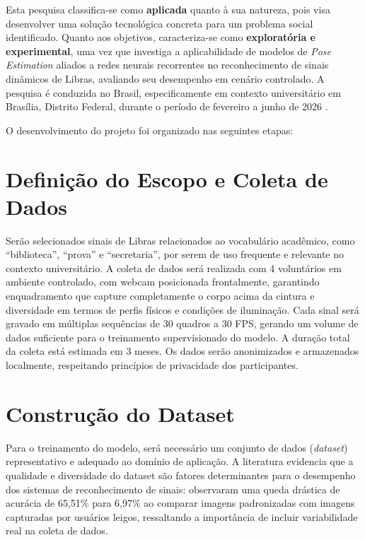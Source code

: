 
Esta pesquisa classifica-se como \textbf{aplicada} quanto à sua natureza, pois visa desenvolver uma solução tecnológica concreta para um problema social identificado. Quanto aos objetivos, caracteriza-se como \textbf{exploratória e experimental}, uma vez que investiga a aplicabilidade de modelos de \textit{Pose Estimation} aliados a redes neurais recorrentes no reconhecimento de sinais dinâmicos de Libras, avaliando seu desempenho em cenário controlado. A pesquisa é conduzida no Brasil, especificamente em contexto universitário em Brasília, Distrito Federal, durante o período de fevereiro a junho de 2026 \cite{attili:24, jain:24}.

O desenvolvimento do projeto foi organizado nas seguintes etapas:

\section{Definição do Escopo e Coleta de Dados}

Serão selecionados sinais de Libras relacionados ao vocabulário acadêmico, como ``biblioteca'', ``prova'' e ``secretaria'', por serem de uso frequente e relevante no contexto universitário. A coleta de dados será realizada com 4 voluntários em ambiente controlado, com webcam posicionada frontalmente, garantindo enquadramento que capture completamente o corpo acima da cintura e diversidade em termos de perfis físicos e condições de iluminação. Cada sinal será gravado em múltiplas sequências de 30 quadros a 30 FPS, gerando um volume de dados suficiente para o treinamento supervisionado do modelo. A duração total da coleta está estimada em 3 meses. Os dados serão anonimizados e armazenados localmente, respeitando princípios de privacidade dos participantes.

\section{Construção do Dataset}

Para o treinamento do modelo, será necessário um conjunto de dados (\textit{dataset}) representativo e adequado ao domínio de aplicação. A literatura evidencia que a qualidade e diversidade do dataset são fatores determinantes para o desempenho dos sistemas de reconhecimento de sinais:  observaram uma queda drástica de acurácia de 65,51\% para 6,97\% ao comparar imagens padronizadas com imagens capturadas por usuários leigos, ressaltando a importância de incluir variabilidade real na coleta de dados.

